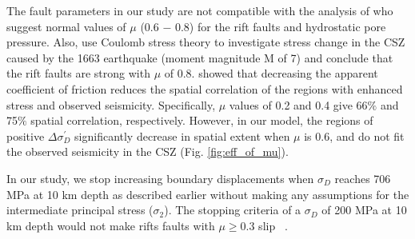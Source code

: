 \documentclass[draft]{agujournal2018}
\begin{document}
The fault parameters in our study are not compatible with the analysis of \citet{Hurd_Zoback_2012,Hurd_Zoback2012b} who suggest normal values of $\mu$ (0.6 $-$ 0.8) for the rift faults and hydrostatic pore pressure. Also, \citet{Fereidoni2014} use Coulomb stress theory to investigate stress change in the CSZ caused by the 1663 earthquake (moment magnitude M of 7) and conclude that the rift faults are strong with $\mu$ of 0.8. \citet{Fereidoni2014} showed that decreasing the apparent coefficient of friction reduces the spatial correlation of the regions with enhanced stress and observed seismicity. Specifically, $\mu$ values of 0.2 and 0.4 give 66$\%$ and 75$\%$ spatial correlation, respectively. However, in our model, the regions of positive $\Delta\sigma_{D}^\prime$ significantly decrease in spatial extent when $\mu$ is 0.6, and do not fit the observed seismicity in the CSZ (Fig. \ref{fig:eff_of_mu}).

 In our study, we stop increasing boundary displacements when $\sigma_{D}$ reaches 706 MPa at 10 km depth as described earlier without making any assumptions for the intermediate principal stress ($\sigma_2$).  \citet{Baird_2010}  The stopping criteria of a $\sigma_{D}$ of 200 MPa at 10 km depth would not make rifts faults with $\mu \ge 0.3$ slip ~\citep[e.g.,][]{ChenChen18}. 
\end{document}
